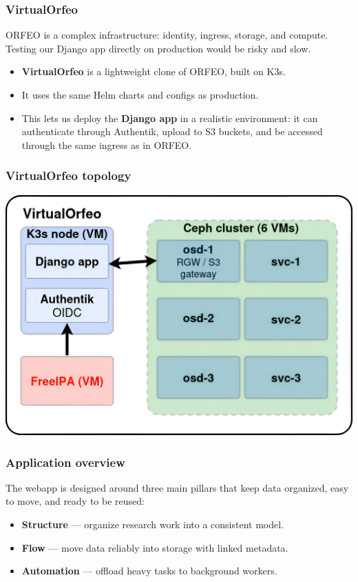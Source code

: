 \documentclass{beamer}
\begin{document}
	\begin{frame}
		\frametitle{VirtualOrfeo}
		
		ORFEO is a complex infrastructure: identity, ingress, storage, and compute.  
		Testing our Django app directly on production would be risky and slow.
		
		\vspace{1em}
		\begin{itemize}
			\item \textbf{VirtualOrfeo} is a lightweight clone of ORFEO, built on K3s.
			\item It uses the same Helm charts and configs as production.
			\item This lets us deploy the \textbf{Django app} in a realistic environment:
			it can authenticate through Authentik, upload to S3 buckets,
			and be accessed through the same ingress as in ORFEO.
		\end{itemize}
	\end{frame}
	
	\begin{frame}
		\frametitle{VirtualOrfeo topology}
		\includegraphics[width=\textwidth]{otherResources/VirtualOrfeo_topology.png}
	\end{frame}
	
	\begin{frame}
		\frametitle{Application overview}
		
		The webapp is designed around three main pillars that keep data organized, 
		easy to move, and ready to be reused:
		
		\vspace{0.8em}
		\begin{itemize}
			\item \textbf{Structure} — organize research work into a consistent model.
			\item \textbf{Flow} — move data reliably into storage with linked metadata.
			\item \textbf{Automation} — offload heavy tasks to background workers.
		\end{itemize}
	\end{frame}
	
\end{document}
